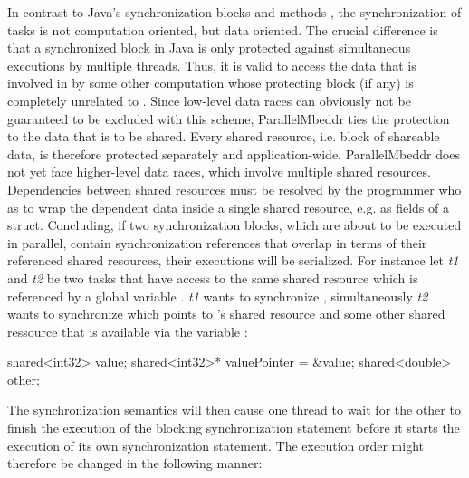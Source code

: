In contrast to Java's synchronization blocks and methods \cite[p.~279]{JavaPerformanceTuning}, the synchronization of tasks is not computation oriented, but data oriented. The crucial difference is that a synchronized block  in Java is only protected against simultaneous executions by multiple threads. Thus, it is valid to access the data that is involved in  by some other computation whose protecting block (if any) is completely unrelated to . Since low-level data races can obviously not be guaranteed to be excluded with this scheme, ParallelMbeddr ties the protection to the data that is to be shared. Every shared resource, i.e. block of shareable data, is therefore protected separately and application-wide. ParallelMbeddr does not yet face higher-level data races, which involve multiple shared resources. Dependencies between shared resources must be resolved by the programmer who as to wrap the dependent data inside a single shared resource, e.g. as fields of a struct. Concluding, if two synchronization blocks, which are about to be executed in parallel, contain synchronization references that overlap in terms of their referenced shared resources, their executions will be serialized. For instance let \textit{t1} and \textit{t2} be two tasks that have access to the same shared resource which is referenced by a global variable . \textit{t1} wants to synchronize , simultaneously \textit{t2} wants to synchronize  which points to 's shared resource and some other shared ressource that is available via the variable :

\begin{ccode}
shared<int32> value;
shared<int32>* valuePointer = &value;
shared<double> other;
\end{ccode}
The synchronization semantics will then cause one thread to wait for the other to finish the execution of the blocking synchronization statement before it starts the execution of its own synchronization statement. The execution order might therefore be changed in the following manner:

